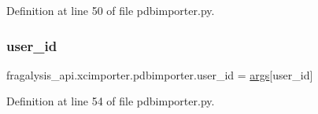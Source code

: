 Definition at line 50 of file pdbimporter.\+py.

\mbox{\label{namespacefragalysis__api_1_1xcimporter_1_1pdbimporter_a9cee2acc4fc991cee1a09431247027f9}} 
\subsubsection{\texorpdfstring{user\+\_\+id}{user\_id}}
{\footnotesize\ttfamily fragalysis\+\_\+api.\+xcimporter.\+pdbimporter.\+user\+\_\+id = \hyperlink{namespacefragalysis__api_1_1xcimporter_1_1pdbimporter_a98658023f7019ff38aa6fc1beb1be986}{args}\mbox{[}\textquotesingle{}user\+\_\+id\textquotesingle{}\mbox{]}}



Definition at line 54 of file pdbimporter.\+py.

